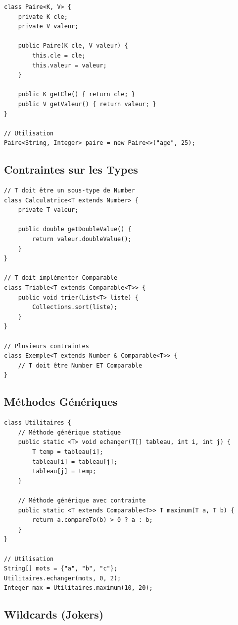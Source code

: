 \documentclass[11pt,a4paper]{article}
\begin{document}
\begin{lstlisting}
class Paire<K, V> {
    private K cle;
    private V valeur;
    
    public Paire(K cle, V valeur) {
        this.cle = cle;
        this.valeur = valeur;
    }
    
    public K getCle() { return cle; }
    public V getValeur() { return valeur; }
}

// Utilisation
Paire<String, Integer> paire = new Paire<>("age", 25);
\end{lstlisting}

\subsection{Contraintes sur les Types}

\begin{lstlisting}
// T doit être un sous-type de Number
class Calculatrice<T extends Number> {
    private T valeur;
    
    public double getDoubleValue() {
        return valeur.doubleValue();
    }
}

// T doit implémenter Comparable
class Triable<T extends Comparable<T>> {
    public void trier(List<T> liste) {
        Collections.sort(liste);
    }
}

// Plusieurs contraintes
class Exemple<T extends Number & Comparable<T>> {
    // T doit être Number ET Comparable
}
\end{lstlisting}

\subsection{Méthodes Génériques}

\begin{lstlisting}
class Utilitaires {
    // Méthode générique statique
    public static <T> void echanger(T[] tableau, int i, int j) {
        T temp = tableau[i];
        tableau[i] = tableau[j];
        tableau[j] = temp;
    }
    
    // Méthode générique avec contrainte
    public static <T extends Comparable<T>> T maximum(T a, T b) {
        return a.compareTo(b) > 0 ? a : b;
    }
}

// Utilisation
String[] mots = {"a", "b", "c"};
Utilitaires.echanger(mots, 0, 2);
Integer max = Utilitaires.maximum(10, 20);
\end{lstlisting}

\subsection{Wildcards (Jokers)}
\end{document}
